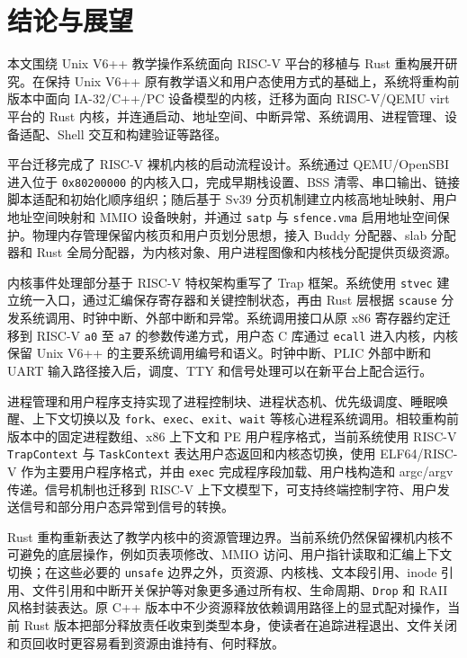 \chapter{结论与展望}\label{chap:conclusion}

本文围绕 Unix V6++ 教学操作系统面向 RISC-V 平台的移植与 Rust 重构展开研究。在保持 Unix V6++ 原有教学语义和用户态使用方式的基础上，系统将重构前版本中面向 IA-32/C++/PC 设备模型的内核，迁移为面向 RISC-V/QEMU virt 平台的 Rust 内核，并连通启动、地址空间、中断异常、系统调用、进程管理、设备适配、Shell 交互和构建验证等路径。

平台迁移完成了 RISC-V 裸机内核的启动流程设计。系统通过 QEMU/OpenSBI 进入位于 \verb|0x80200000| 的内核入口，完成早期栈设置、BSS 清零、串口输出、链接脚本适配和初始化顺序组织；随后基于 Sv39 分页机制建立内核高地址映射、用户地址空间映射和 MMIO 设备映射，并通过 \verb|satp| 与 \verb|sfence.vma| 启用地址空间保护。物理内存管理保留内核页和用户页划分思想，接入 Buddy 分配器、slab 分配器和 Rust 全局分配器，为内核对象、用户进程图像和内核栈分配提供页级资源。

内核事件处理部分基于 RISC-V 特权架构重写了 Trap 框架。系统使用 \verb|stvec| 建立统一入口，通过汇编保存寄存器和关键控制状态，再由 Rust 层根据 \verb|scause| 分发系统调用、时钟中断、外部中断和异常。系统调用接口从原 x86 寄存器约定迁移到 RISC-V \verb|a0| 至 \verb|a7| 的参数传递方式，用户态 C 库通过 \verb|ecall| 进入内核，内核保留 Unix V6++ 的主要系统调用编号和语义。时钟中断、PLIC 外部中断和 UART 输入路径接入后，调度、TTY 和信号处理可以在新平台上配合运行。

进程管理和用户程序支持实现了进程控制块、进程状态机、优先级调度、睡眠唤醒、上下文切换以及 \verb|fork|、\verb|exec|、\verb|exit|、\verb|wait| 等核心进程系统调用。相较重构前版本中的固定进程数组、x86 上下文和 PE 用户程序格式，当前系统使用 RISC-V \verb|TrapContext| 与 \verb|TaskContext| 表达用户态返回和内核态切换，使用 ELF64/RISC-V 作为主要用户程序格式，并由 \verb|exec| 完成程序段加载、用户栈构造和 argc/argv 传递。信号机制也迁移到 RISC-V 上下文模型下，可支持终端控制字符、用户发送信号和部分用户态异常到信号的转换。

Rust 重构重新表达了教学内核中的资源管理边界。当前系统仍然保留裸机内核不可避免的底层操作，例如页表项修改、MMIO 访问、用户指针读取和汇编上下文切换；在这些必要的 \verb|unsafe| 边界之外，页资源、内核栈、文本段引用、inode 引用、文件引用和中断开关保护等对象更多通过所有权、生命周期、\verb|Drop| 和 RAII 风格封装表达。原 C++ 版本中不少资源释放依赖调用路径上的显式配对操作，当前 Rust 版本把部分释放责任收束到类型本身，使读者在追踪进程退出、文件关闭和页回收时更容易看到资源由谁持有、何时释放。

